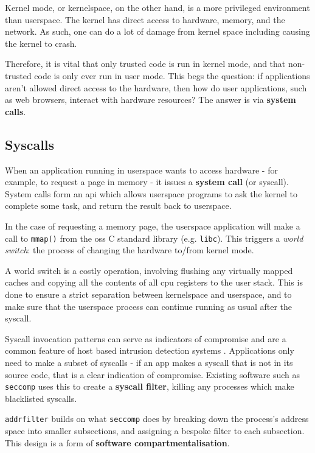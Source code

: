 Kernel mode, or kernelspace, on the other hand, is a more privileged environment
than userspace. The kernel has direct access to hardware, memory, and the
network. As such, one can do a lot of damage from kernel space including causing
the kernel to crash.

Therefore, it is vital that only trusted code is run in kernel mode, and that
non-trusted code is only ever run in user mode. This begs the question: if
applications aren't allowed direct access to the hardware, then how do user
applications, such as web browsers, interact with hardware resources? The answer
is via \textbf{system calls}.


\subsection{Syscalls}

When an application running in userspace wants to access hardware - for example,
to request a page in memory - it issues a \textbf{system call} (or syscall). System calls
form an \ac{api} which allows userspace programs to ask the kernel to complete some
task, and return the result back to userspace.

In the case of requesting a memory page, the userspace application will make a
call to \texttt{mmap()} from the \acp{os} C standard library (e.g. \texttt{libc}).
This triggers a \textit{world switch}: the process of changing the hardware
to/from kernel mode.

A world switch is a costly operation, involving flushing any virtually mapped
caches and copying all the contents of all \ac{cpu} registers to the user stack. This
is done to ensure a strict separation between kernelspace and userspace, and to
make sure that the userspace process can continue running as usual after the
syscall.

Syscall invocation patterns can serve as indicators of compromise
and are a common feature of host based intrusion detection systems \cite{10.1145/3214304}. 
Applications only need to make a subset of syscalls
- if an app makes a syscall that is not in its source code, that is a clear
indication of compromise. Existing software such as \texttt{seccomp} uses this
to create a \textbf{syscall filter}, killing any processes which make
blacklisted syscalls. 

\texttt{addrfilter} builds on what \texttt{seccomp} does by breaking down the
process's address space into smaller subsections, and assigning a bespoke filter
to each subsection. This design is a form of \textbf{software
compartmentalisation}. 


